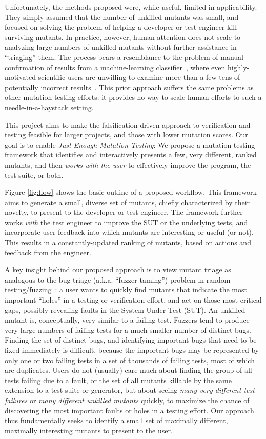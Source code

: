 Unfortunately, the
methods proposed were, while useful, limited in applicability.  They simply assumed that the number of unkilled mutants was
small, and focused on solving the problem of helping a developer or
test engineer kill surviving mutants.
In practice, however, human
attention does not scale to analyzing large numbers of
unkilled mutants without further assistance in ``triaging'' them.  The process bears a
resemblance to the problem of manual confirmation of results from a
machine-learning classifier~\cite{OnlyOracle,EndUserMistake}, where even highly-motivated scientific
users are unwilling to examine more than a few tens of
potentially incorrect results~\cite{Segal}.
This prior approach suffers the same problems as other
mutation testing efforts: it provides no way to
scale human efforts to such a needle-in-a-haystack setting.

This project aims to make the falsification-driven approach to verification and testing feasible for larger
projects, and those with lower mutation scores.
Our goal is to enable \emph{Just Enough Mutation Testing}: We propose a mutation
testing framework that identifies and interactively presents a few, very
different, ranked mutants, and then \emph{works with the user} to 
effectively improve the program, the test suite, or both.

Figure \ref{fig:flow} shows the basic outline of a proposed workflow.
%
This framework aims to generate a small, diverse set of
mutants, chiefly characterized by their novelty, to present to the developer or
test engineer.  The framework further works
 \emph{with} the test engineer to improve the SUT or
the underlying tests, and incorporate user feedback into which mutants are
interesting or useful (or not).  This results in a constantly-updated ranking of mutants,
based on actions and feedback from the engineer.

A key insight behind our proposed approach is to view mutant triage as
analogous to the bug triage
(a.k.a.  ``fuzzer
taming'') problem in random testing/fuzzing~\cite{PLDI13,distMut,SemCrash,vantonder-ase18}:  a user wants
to quickly find mutants that indicate the most important ``holes'' in a testing
or verification effort, and act on those most-critical gaps, possibly revealing
faults in the System Under Test (SUT).
An unkilled mutant is, conceptually, very similar to a failing test.
Fuzzers tend to produce very large numbers of failing tests for a much
smaller number of distinct bugs.  Finding the set of distinct bugs,
and identifying important bugs that need to be fixed immediately is
difficult, because the important bugs may be represented by only one
or two failing tests in a set of thousands of failing tests, most of
which are duplicates.
Users do not (usually) care much
about finding the group of all tests failing due to a fault, or the
set of all mutants killable by the same extension to a test suite or
generator, but about seeing \emph{many very different test failures}
or \emph{many
  different unkilled mutants} quickly, to maximize the chance of
discovering the most important faults or holes in a testing effort.
Our approach thus fundamentally seeks to identify a small set of maximally different, maximally interesting mutants to present
to the user.

